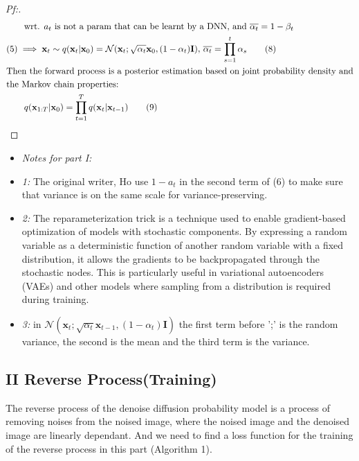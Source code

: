 \documentclass{article}
\begin{document}
\begin{proof}[\textit{Pf:}]
\begin{align}
        &\qquad \text{wrt. } a_t \text{ is not a param that can be learnt by a DNN, and } \overline {\alpha _t} = 1 - \beta _t \notag \\
        &(5)\implies \mathbf{x}_t \sim q(\mathbf{x}_t|\mathbf{x}_{0}) = \mathcal{N}(\mathbf{x}_{t}; \sqrt{\alpha _t}\mathbf{x}_{0}, (1-\alpha _t)\mathbf{I}),\, \overline{\alpha _t} = \prod_{s=1}^{t} \alpha _s \tag{8} \\
        &\text{Then the forward process is a posterior estimation based on joint probability density and} \notag\\
        &\text{the Markov chain properties: } \notag\\
        &\qquad q(\mathbf{x}_{1:T}|\mathbf{x}_{0}) = \prod_{t = 1}^{T} q(\mathbf{x}_t|\mathbf{x}_{t-1}) \tag{9}
    \end{align}
\end{proof}

\begin{itemize}
    \item \textit{Notes for part I:}
    \item \textit{1:} The original writer, Ho use $1 - a_t$ in the second term of (6) to make sure that variance is on the same scale for variance-preserving.
    \item \textit{2:} The reparameterization trick is a technique used to enable gradient-based optimization of models with stochastic components. By expressing a random variable as a deterministic function of another random variable with a fixed distribution, it allows the gradients to be backpropagated through the stochastic nodes. This is particularly useful in variational autoencoders (VAEs) and other models where sampling from a distribution is required during training.
    \item \textit{3:} in $\mathcal{N}(\mathbf{x}_{t}; \sqrt{\alpha _t}\mathbf{x}_{t-1}, (1-\alpha _t)\mathbf{I})$ the first term before ';' is the random variance, the second is the mean and the third term is the variance.
\end{itemize}

\subsection*{II Reverse Process(Training)}
\begin{flushleft}
    The reverse process of the denoise diffusion probability model is a process of removing noises from the noised image, where the noised image and the denoised image are linearly dependant. And we need to find a loss function for the training of the reverse process in this part (Algorithm 1).
\end{flushleft}
\end{document}
